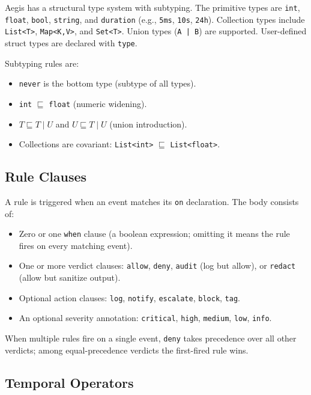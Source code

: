 \documentclass[sigconf]{acmart}
\begin{document}
Aegis has a structural type system with subtyping. The primitive types are
\texttt{int}, \texttt{float}, \texttt{bool}, \texttt{string}, and
\texttt{duration} (e.g., \texttt{5ms}, \texttt{10s}, \texttt{24h}).
Collection types include \texttt{List<T>}, \texttt{Map<K,V>}, and
\texttt{Set<T>}. Union types (\texttt{A | B}) are supported. User-defined
struct types are declared with \texttt{type}.

Subtyping rules are:
\begin{itemize}
  \item \texttt{never} is the bottom type (subtype of all types).
  \item \texttt{int} $\sqsubseteq$ \texttt{float} (numeric widening).
  \item $T \sqsubseteq T \mid U$ and $U \sqsubseteq T \mid U$ (union
    introduction).
  \item Collections are covariant: \texttt{List<int>} $\sqsubseteq$
    \texttt{List<float>}.
\end{itemize}

\subsection{Rule Clauses}

A rule is triggered when an event matches its \texttt{on} declaration.
The body consists of:
\begin{itemize}
  \item Zero or one \texttt{when} clause (a boolean expression; omitting it
    means the rule fires on every matching event).
  \item One or more verdict clauses: \texttt{allow}, \texttt{deny},
    \texttt{audit} (log but allow), or \texttt{redact} (allow but sanitize
    output).
  \item Optional action clauses: \texttt{log}, \texttt{notify},
    \texttt{escalate}, \texttt{block}, \texttt{tag}.
  \item An optional severity annotation: \texttt{critical}, \texttt{high},
    \texttt{medium}, \texttt{low}, \texttt{info}.
\end{itemize}

When multiple rules fire on a single event, \texttt{deny} takes precedence over
all other verdicts; among equal-precedence verdicts the first-fired rule wins.

\subsection{Temporal Operators}
\label{sec:temporal}
\end{document}
